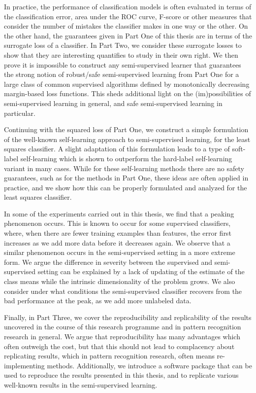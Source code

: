 In practice, the performance of classification models is often evaluated in terms of the classification error, area under the ROC curve, F-score or other measures that consider the number of mistakes the classifier makes in one way or the other. On the other hand, the guarantees given in Part One of this thesis are in terms of the surrogate loss of a classifier. In Part Two, we consider these surrogate losses to show that they are interesting quantifies to study in their own right. We then prove it is impossible to construct any semi-supervised learner that guarantees the strong notion of robust/safe semi-supervised learning from Part One for a large class of common supervised algorithms defined by monotonically decreasing margin-based loss functions. This sheds additional light on the (im)possibilities of semi-supervised learning in general, and safe semi-supervised learning in particular.

Continuing with the squared loss of Part One, we construct a simple formulation of the well-known self-learning approach to semi-supervised learning, for the least squares classifier. A slight adaptation of this formulation leads to a type of soft-label self-learning which is shown to outperform the hard-label self-learning variant in many cases. While for these self-learning methods there are no safety guarantees, such as for the methods in Part One, these ideas are often applied in practice, and we show how this can be properly formulated and analyzed for the least squares classifier.

In some of the experiments carried out in this thesis, we find that a peaking phenomenon occurs. This is known to occur for some supervised classifiers, where, when there are fewer training examples than features, the error first increases as we add more data before it decreases again. We observe that a similar phenomenon occurs in the semi-supervised setting in a more extreme form. We argue the difference in severity between the supervised and semi-supervised setting can be explained by a lack of updating of the estimate of the class means while the intrinsic dimensionality of the problem grows. We also consider under what conditions the semi-supervised classifier recovers from the bad performance at the peak, as we add more unlabeled data.

Finally, in Part Three, we cover the reproducibility and replicability of the results uncovered in the course of this research programme and in pattern recognition research in general. We argue that reproducibility has many advantages which often outweigh the cost, but that this should not lead to complacency about replicating results, which in pattern recognition research, often means re-implementing methods. Additionally, we introduce a software package that can be used to reproduce the results presented in this thesis, and to replicate various well-known results in the semi-supervised learning.

